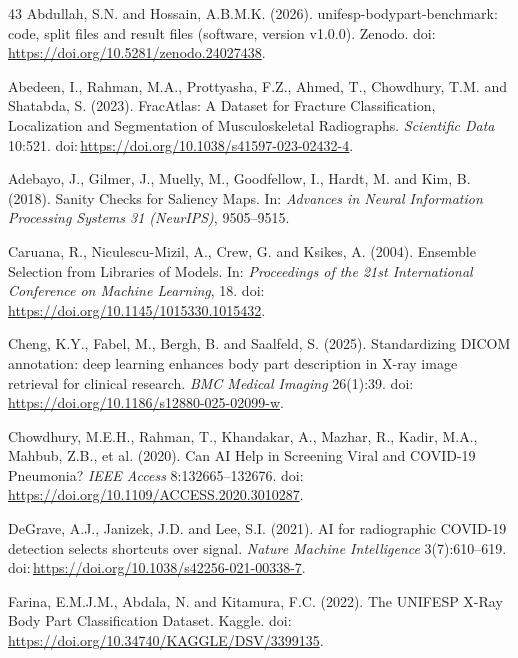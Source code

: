 \begin{thebibliography}{43}
Abdullah, S.N. and Hossain, A.B.M.K. (2026). unifesp-bodypart-benchmark: code, split files and result files (software, version v1.0.0). Zenodo. doi:\,\url{https://doi.org/10.5281/zenodo.24027438}.

Abedeen, I., Rahman, M.A., Prottyasha, F.Z., Ahmed, T., Chowdhury, T.M. and Shatabda, S. (2023). FracAtlas: A Dataset for Fracture Classification, Localization and Segmentation of Musculoskeletal Radiographs. \textit{Scientific Data} 10:521. doi:\,\url{https://doi.org/10.1038/s41597-023-02432-4}.

Adebayo, J., Gilmer, J., Muelly, M., Goodfellow, I., Hardt, M. and Kim, B. (2018). Sanity Checks for Saliency Maps. In: \textit{Advances in Neural Information Processing Systems 31 (NeurIPS)}, 9505--9515.

Caruana, R., Niculescu-Mizil, A., Crew, G. and Ksikes, A. (2004). Ensemble Selection from Libraries of Models. In: \textit{Proceedings of the 21st International Conference on Machine Learning}, 18. doi:\,\url{https://doi.org/10.1145/1015330.1015432}.

Cheng, K.Y., Fabel, M., Bergh, B. and Saalfeld, S. (2025). Standardizing DICOM annotation: deep learning enhances body part description in X-ray image retrieval for clinical research. \textit{BMC Medical Imaging} 26(1):39. doi:\,\url{https://doi.org/10.1186/s12880-025-02099-w}.

Chowdhury, M.E.H., Rahman, T., Khandakar, A., Mazhar, R., Kadir, M.A., Mahbub, Z.B., et al. (2020). Can AI Help in Screening Viral and COVID-19 Pneumonia? \textit{IEEE Access} 8:132665--132676. doi:\,\url{https://doi.org/10.1109/ACCESS.2020.3010287}.

DeGrave, A.J., Janizek, J.D. and Lee, S.I. (2021). AI for radiographic COVID-19 detection selects shortcuts over signal. \textit{Nature Machine Intelligence} 3(7):610--619. doi:\,\url{https://doi.org/10.1038/s42256-021-00338-7}.

Farina, E.M.J.M., Abdala, N. and Kitamura, F.C. (2022). The UNIFESP X-Ray Body Part Classification Dataset. Kaggle. doi:\,\url{https://doi.org/10.34740/KAGGLE/DSV/3399135}.


\end{thebibliography}
